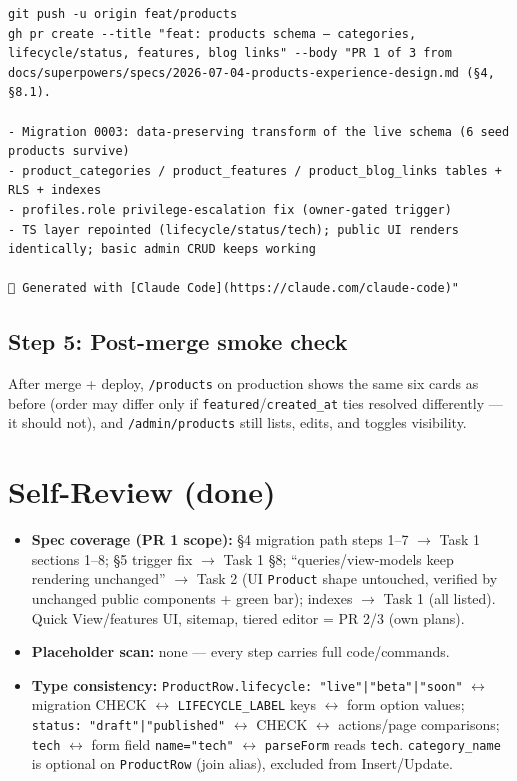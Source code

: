 \documentclass[11pt,a4paper]{article}
\begin{document}
\begin{lstlisting}
git push -u origin feat/products
gh pr create --title "feat: products schema — categories, lifecycle/status, features, blog links" --body "PR 1 of 3 from docs/superpowers/specs/2026-07-04-products-experience-design.md (§4, §8.1).

- Migration 0003: data-preserving transform of the live schema (6 seed products survive)
- product_categories / product_features / product_blog_links tables + RLS + indexes
- profiles.role privilege-escalation fix (owner-gated trigger)
- TS layer repointed (lifecycle/status/tech); public UI renders identically; basic admin CRUD keeps working

🤖 Generated with [Claude Code](https://claude.com/claude-code)"
\end{lstlisting}

\subsection*{Step 5: Post-merge smoke check}

After merge + deploy, \texttt{/products} on production shows the same six cards as before
(order may differ only if \texttt{featured}/\texttt{created\_at} ties resolved differently ---
it should not), and \texttt{/admin/products} still lists, edits, and toggles visibility.

\section{Self-Review (done)}
\begin{itemize}
  \item \textbf{Spec coverage (PR 1 scope):} \S4 migration path steps 1--7 $\rightarrow$ Task 1
        sections 1--8; \S5 trigger fix $\rightarrow$ Task 1 \S8; ``queries/view-models keep
        rendering unchanged'' $\rightarrow$ Task 2 (UI \texttt{Product} shape untouched, verified
        by unchanged public components + green bar); indexes $\rightarrow$ Task 1 (all listed).
        Quick View/features UI, sitemap, tiered editor = PR 2/3 (own plans).
  \item \textbf{Placeholder scan:} none --- every step carries full code/commands.
  \item \textbf{Type consistency:} \texttt{ProductRow.lifecycle: "live"|"beta"|"soon"}
        $\leftrightarrow$ migration CHECK $\leftrightarrow$ \texttt{LIFECYCLE\_LABEL} keys
        $\leftrightarrow$ form option values; \texttt{status: "draft"|"published"}
        $\leftrightarrow$ CHECK $\leftrightarrow$ actions/page comparisons; \texttt{tech}
        $\leftrightarrow$ form field \texttt{name="tech"} $\leftrightarrow$ \texttt{parseForm}
        reads \texttt{tech}. \texttt{category\_name} is optional on \texttt{ProductRow} (join
        alias), excluded from Insert/Update.
\end{itemize}
\end{document}
